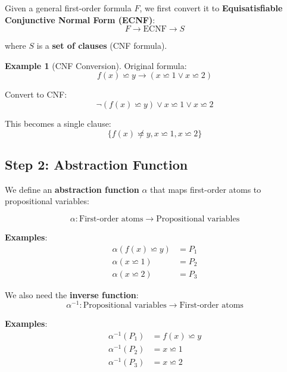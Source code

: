 \documentclass[11pt,a4paper]{article}
\theoremstyle{definition}
\newtheorem{example}{Example}[section]
\theoremstyle{plain}
\theoremstyle{remark}
\begin{document}
Given a general first-order formula $F$, we first convert it to \textbf{Equisatisfiable Conjunctive Normal Form (ECNF)}:
\[
F \longrightarrow \text{ECNF} \longrightarrow S
\]



where $S$ is a \textbf{set of clauses} (CNF formula).



\begin{example}[CNF Conversion]

Original formula:
\[
f(x) \backsimeq y \rightarrow (x \backsimeq 1 \vee x \backsimeq 2)
\]

Convert to CNF:
\[
\neg(f(x) \backsimeq y) \vee x \backsimeq 1 \vee x \backsimeq 2
\]



This becomes a single clause:
\[
\{f(x) \not\backsimeq y, x \backsimeq 1, x \backsimeq 2\}
\]

\end{example}



\subsection{Step 2: Abstraction Function}



We define an \textbf{abstraction function} $\alpha$ that maps first-order atoms to propositional variables:



\begin{tcolorbox}[colback=blue!5!white,colframe=blue!75!black,title=\textbf{Abstraction Function}]
\[
\alpha: \text{First-order atoms} \longrightarrow \text{Propositional variables}
\]



\textbf{Examples}:
\begin{align*}
\alpha(f(x) \backsimeq y) &= P_1 \\
\alpha(x \backsimeq 1) &= P_2 \\
\alpha(x \backsimeq 2) &= P_3
\end{align*}



We also need the \textbf{inverse function}:
\[
\alpha^{-1}: \text{Propositional variables} \longrightarrow \text{First-order atoms}
\]

\textbf{Examples}:
\begin{align*}
\alpha^{-1}(P_1) &= f(x) \backsimeq y \\
\alpha^{-1}(P_2) &= x \backsimeq 1 \\
\alpha^{-1}(P_3) &= x \backsimeq 2
\end{align*}

\end{tcolorbox}
\end{document}
